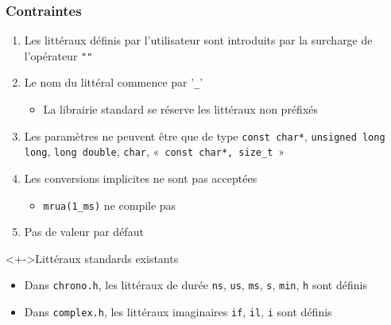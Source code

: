 \begin{frame}
\frametitle{Contraintes}
\begin{enumerate}[<+->]
\item Les littéraux définis par l’utilisateur sont introduits par la surcharge
de l’opérateur \lstinline|""|
\item Le nom du littéral commence par '\texttt{\_}'
	\begin{itemize}
	\item La librairie standard se réserve les littéraux non préfixés
	\end{itemize}
\item Les paramètres ne peuvent être que de type \lstinline|const char*|, \lstinline|unsigned long long|, \lstinline|long double|, \lstinline|char|, «~\lstinline|const char*, size_t|~»
\item Les conversions implicites ne sont pas acceptées
	\begin{itemize}
	\item \texttt{mrua(1\_ms)} ne compile pas
	\end{itemize}
\item Pas de valeur par défaut
\end{enumerate}
\begin{exampleblock}<+->{Littéraux standards existants}
	\begin{itemize}[<+->]
	\item Dans \texttt{chrono.h}, les littéraux de durée \texttt{ns}, \texttt{us}, \texttt{ms}, \texttt{s}, \texttt{min}, \texttt{h} sont définis
	\item Dans \texttt{complex.h}, les littéraux imaginaires \texttt{if}, \texttt{il}, \texttt{i} sont définis 
	\end{itemize}
\end{exampleblock}
\end{frame}


